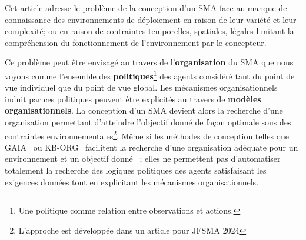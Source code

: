 \documentclass[demonstration]{jfsma}
\newcounter{relation}
\begin{document}




%

Cet article adresse le problème de la conception d'un SMA face au manque de connaissance des environnements de déploiement en raison de leur variété et leur complexité; ou en raison de contraintes temporelles, spatiales, légales limitant la compréhension  du fonctionnement de l'environnement par le concepteur.

Ce problème peut être envisagé au travers de l'\textbf{organisation} du SMA que nous voyons comme l'ensemble des \textbf{politiques}\footnote{Une politique comme relation entre observations et actions.} des agents considéré tant du point de vue individuel que du point de vue global. Les mécanismes organisationnels induit par ces politiques peuvent être explicités au travers de \textbf{modèles organisationnels}.
La conception d'un SMA devient alors la recherche d'une organisation permettant d'atteindre l'objectif donné de façon optimale sous des contraintes environnementales\footnote{L'approche est développée dans un article pour JFSMA 2024}.
Même si les méthodes de conception telles que GAIA~\cite{Cernuzzi2014} ou KB-ORG~\cite{Sims2008} facilitent la recherche d'une organisation adéquate pour un environnement et un objectif donné~\cite{Mefteh2013} ; elles ne permettent pas d'automatiser totalement la recherche des logiques politiques des agents satisfaisant les exigences données tout en explicitant les mécanismes organisationnels.
\end{document}
